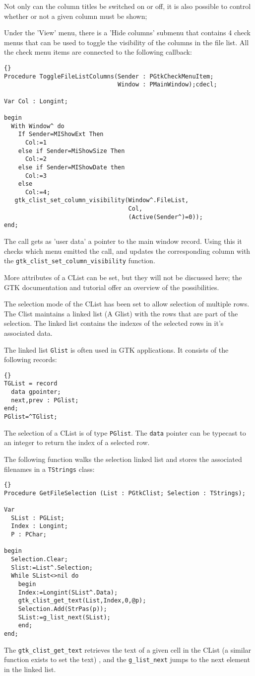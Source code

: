 \documentclass[10pt]{article}
\begin{document}
Not only can the column titles be switched on or off, it is also possible to
control whether or not a given column must be shown;

Under the 'View' menu, there is a 'Hide columns' submenu that contains 4
check menus that can be used to toggle the visibility of the columns in the
file list. All the check menu items are connected to the following callback:
\begin{lstlisting}{}
Procedure ToggleFileListColumns(Sender : PGtkCheckMenuItem;
                                Window : PMainWindow);cdecl;

Var Col : Longint;

begin
  With Window^ do
    If Sender=MIShowExt Then
      Col:=1
    else if Sender=MiShowSize Then
      Col:=2
    else if Sender=MIShowDate then
      Col:=3
    else 
      Col:=4;
   gtk_clist_set_column_visibility(Window^.FileList,
                                   Col,
                                   (Active(Sender^)=0));   
end;
\end{lstlisting}
The call gets as 'user data' a pointer to the main window record. Using this
it checks which menu emitted the call, and updates the corresponding column
with the \lstinline|gtk_clist_set_column_visibility| function.

More attributes of a CList can be set, but they will not be discussed here; 
the GTK documentation and tutorial offer an overview of the possibilities. 

The selection mode of the CList has been set to allow selection of multiple
rows. The Clist maintains a linked list (A Glist) with the rows that are
part of the selection. The linked list contains the indexes of the selected
rows in it's associated data.

The linked list \lstinline|Glist| is often used in GTK applications. 
It consists of the  following records:
\begin{lstlisting}{}
TGList = record
  data gpointer;
  next,prev : PGlist;
end;
PGlist=^TGlist;
\end{lstlisting}
The selection of a CList is of type \lstinline|PGlist|. The \lstinline|data|
pointer can be typecast to an integer to return the index of a selected
row.

The following function walks the selection linked list and stores the
associated filenames in a \lstinline|TStrings| class:
\begin{lstlisting}{}
Procedure GetFileSelection (List : PGtkClist; Selection : TStrings);

Var
  SList : PGList;
  Index : Longint;
  P : PChar;
  
begin
  Selection.Clear;
  Slist:=List^.Selection;
  While SList<>nil do
    begin
    Index:=Longint(SList^.Data);
    gtk_clist_get_text(List,Index,0,@p);
    Selection.Add(StrPas(p));
    SList:=g_list_next(SList);
    end;
end;
\end{lstlisting}
The \lstinline|gtk_clist_get_text| retrieves the text of a given cell in the
CList (a similar function exists to set the text) , and the
\lstinline|g_list_next| jumps to the next element in the linked list.
\end{document}
